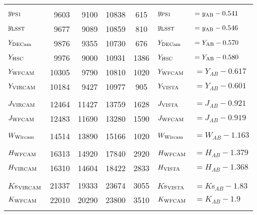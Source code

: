 \documentclass[usenatbib]{mnras}
\begin{document}
\begin{table*}
\begin{center}
\begin{tabular}{l r r r  c l l}
      &&&&&&\\
      $y_{\rm PS1}$       &       9603    &  9100    &    10838  &     615       &  $y_{\rm PS1}    $       &$   = y_{\rm AB} -  0.541 $ \\
      $y_{\rm LSST}$      &       9677   &	 9089    &    10859  &     810         &  $y_{\rm LSST}  $      &$    = y_{\rm AB} - 0.546 $ \\
      $Y_{\rm DECam}$   &      9876   &	  9355    &      10730   &    676      &  $Y_{\rm DECam}  $   &$  =Y_{\rm AB} - 0.570 $ \\
      $Y_{\rm HSC}$       &      9976   &    9000    & 	10931  &   1386    &  $Y_{\rm HSC}  $   &$  =Y_{\rm AB} - 0.580 $ \\
      $Y_{\rm WFCAM}$    &   10305    &   9790      &   10810   &   1020     & $Y_{\rm WFCAM}$     &$ =  Y_{AB}  - 0.617$           \\
      $Y_{\rm VIRCAM}$     &    10184    &   9427      &   10977   &    905        & $Y_{\rm VISTA} $     &$ = Y_{AB}  - 0.601 $          \\
      &&&&&&\\
      $J_{\rm VIRCAM} $     &   12464   &      11427   &    13759   &  1628     &  $J_{\rm VISTA}  $     & $= J_{AB}    - 0.921  $         \\
      $J_{\rm WFCAM} $    &    12483   &     11690  &    13280   &   1590      & $J_{\rm WFCAM}$     & $= J_{AB}    - 0.919 $          \\
      &&&&&&\\
      $W_{\rm Wircam}$   &    14514    &    13890   &    15166   &   1020    & $W_{\rm Wircam} $    & $= W_{AB}  -  1.163$           \\
      &&&&&&\\
      $H_{\rm WFCAM}$    &    16313     &    14920  &    17840   &   2920    & $H_{\rm WFCAM} $   & $= H_{AB}  - 1.379$          \\
      $H_{\rm VIRCAM}$      &    16310    &    14604   &    18422   &   2833     & $H_{\rm VISTA}$      & $= H_{AB}  - 1.368 $        \\
      &&&&&&\\
      $K$s$_{\rm VIRCAM}$     &    21337    &    19333  &    23674   &   3055     & $K$s$_{\rm VISTA}$      & $ = K$s$_{AB} - 1.83  $          \\ 
      $K_{\rm WFCAM}$     &    22010     &    20290 &    23800   &   3510     & $K_{\rm WFCAM}$     & $ = K_{AB} - 1.9  $          \\ 
      &&&&&&\\

\end{tabular}
\end{center}
\end{table*}
\end{document}
